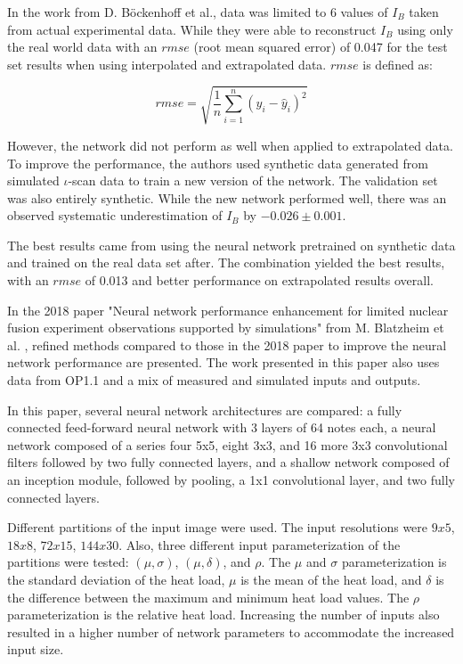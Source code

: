 In the work from D. Böckenhoff et al., data was limited to 6 values of $I_B$ taken from actual experimental data. While they were able to reconstruct $I_B$ using only the real world data with an $rmse$ (root mean squared error) of 0.047 for the test set results when using interpolated and extrapolated data. $rmse$ is defined as:

\begin{equation}
    rmse = \sqrt{\frac{1}{n}\sum_{i=1}^{n}(y_i - \hat{y}_i)^2}
\end{equation}

However, the network did not perform as well when applied to extrapolated data. To improve the performance, the authors used synthetic data generated from simulated $\iota$-scan data to train a new version of the network. The validation set was also entirely synthetic. While the new network performed well, there was an observed systematic underestimation of $I_B$ by $-0.026 \pm 0.001$.

The best results came from using the neural network pretrained on synthetic data and trained on the real data set after. The combination yielded the best results, with an $rmse$ of 0.013 and better performance on extrapolated results overall.

In the 2018 paper "Neural network performance enhancement for limited nuclear fusion experiment observations supported by simulations" from M. Blatzheim et al. \cite{Blatzheim_2018}, refined methods compared to those in the 2018 paper to improve the neural network performance are presented. The work presented in this paper also uses data from OP1.1 and a mix of measured and simulated inputs and outputs.

In this paper, several neural network architectures are compared: a fully connected feed-forward neural network with 3 layers of 64 notes each, a neural network composed of a series four 5x5, eight 3x3, and 16 more 3x3 convolutional filters followed by two fully connected layers, and a shallow network composed of an inception module, followed by pooling, a 1x1 convolutional layer, and two fully connected layers.

Different partitions of the input image were used. The input resolutions were $9x5$, $18x8$, $72x15$, $144x30$. Also, three different input parameterization of the partitions were tested: $(\mu, \sigma)$, $(\mu, \delta)$, and $\rho$. The $\mu$ and $\sigma$ parameterization is the standard deviation of the heat load, $\mu$ is the mean of the heat load, and $\delta$ is the difference between the maximum and minimum heat load values. The $\rho$ parameterization is the relative heat load. Increasing the number of inputs also resulted in a higher number of network parameters to accommodate the increased input size.

